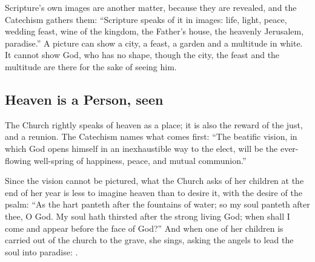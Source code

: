Scripture's own images are another matter, because they are revealed, and the Catechism gathers them: ``Scripture speaks of it in images: life, light, peace, wedding feast, wine of the kingdom, the Father's house, the heavenly Jerusalem, paradise.'' A picture can show a city, a feast, a garden and a multitude in white. It cannot show God, who has no shape, though the city, the feast and the multitude are there for the sake of seeing him.

\subsection{Heaven is a Person, seen}

The Church rightly speaks of heaven as a place; it is also the reward of the just, and a reunion. The Catechism names what comes first: ``The beatific vision, in which God opens himself in an inexhaustible way to the elect, will be the ever-flowing well-spring of happiness, peace, and mutual communion.''

Since the vision cannot be pictured, what the Church asks of her children at the end of her year is less to imagine heaven than to desire it, with the desire of the psalm: ``As the hart panteth after the fountains of water; so my soul panteth after thee, O God. My soul hath thirsted after the strong living God; when shall I come and appear before the face of God?'' And when one of her children is carried out of the church to the grave, she sings, asking the angels to lead the soul into paradise: .
